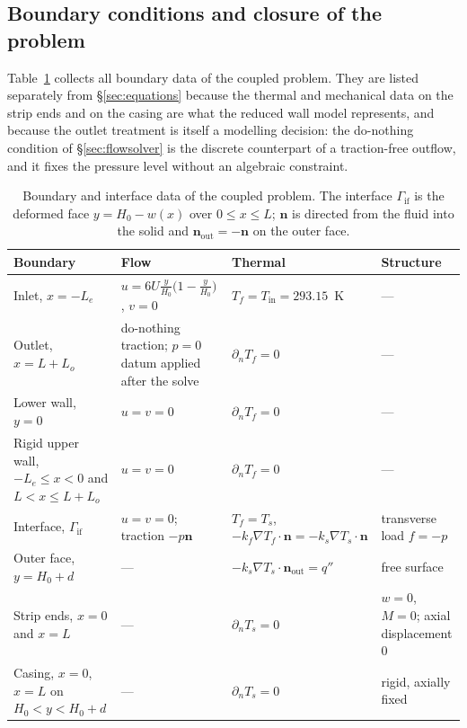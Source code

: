 \documentclass[11pt,a4paper]{article}
\newcommand{\bn}{\mathbf n}
\newcommand{\Ga}{\Gamma}
\begin{document}

\subsection{Boundary conditions and closure of the problem}
\label{sec:bcs}

Table~\ref{tab:bcs} collects all boundary data of the coupled problem. They
are listed separately from \S\ref{sec:equations} because the thermal and
mechanical data on the strip ends and on the casing are what the reduced wall
model represents, and because the outlet treatment is itself a modelling
decision: the do-nothing condition of \S\ref{sec:flowsolver} is the discrete
counterpart of a traction-free outflow, and it fixes the pressure level
without an algebraic constraint.

\begin{table}[htbp]
\centering
\caption{Boundary and interface data of the coupled problem. The interface
$\Ga_{\mathrm{if}}$ is the deformed face $y=H_0-w(x)$ over
$0\le x\le L$; $\bn$ is directed from the fluid into the solid and
$\bn_{\mathrm{out}}=-\bn$ on the outer face.}
\label{tab:bcs}
\small
\begin{tabular}{@{}p{3.3cm}p{3.6cm}p{4.0cm}p{3.4cm}@{}}
\toprule
Boundary & Flow & Thermal & Structure\\
\midrule
Inlet, $x=-L_e$ &
$u=6U\frac{y}{H_0}\bigl(1-\frac{y}{H_0}\bigr)$, $v=0$ &
$T_f=T_{\mathrm{in}}=293.15$~K &
---\\
Outlet, $x=L+L_o$ &
do-nothing traction; $p=0$ datum applied after the solve &
$\partial_n T_f=0$ &
---\\
Lower wall, $y=0$ &
$u=v=0$ &
$\partial_n T_f=0$ &
---\\
Rigid upper wall, $-L_e\le x<0$ and $L<x\le L+L_o$ &
$u=v=0$ &
$\partial_n T_f=0$ &
---\\
Interface, $\Ga_{\mathrm{if}}$ &
$u=v=0$; traction $-p\bn$ &
$T_f=T_s$, $-k_f\nabla T_f\cdot\bn=-k_s\nabla T_s\cdot\bn$ &
transverse load $f=-p$\\
Outer face, $y=H_0+d$ &
--- &
$-k_s\nabla T_s\cdot\bn_{\mathrm{out}}=q''$ &
free surface\\
Strip ends, $x=0$ and $x=L$ &
--- &
$\partial_n T_s=0$ &
$w=0$, $M=0$; axial displacement $0$\\
Casing, $x=0$, $x=L$ on $H_0<y<H_0+d$ &
--- &
$\partial_n T_s=0$ &
rigid, axially fixed\\
\bottomrule
\end{tabular}
\end{table}
\end{document}
